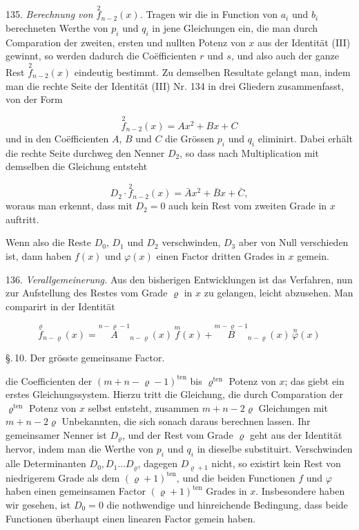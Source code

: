 135. \textit{Berechnung von $\overset{2}{f}_{n-2}(x)$.} Tragen wir die in Function von $a_i$ und $b_i$ berechneten Werthe von $p_i$ und $q_i$ in jene Gleichungen ein, die man durch Comparation der zweiten, ersten und nullten Potenz von $x$ aus der Identität (III) gewinnt, so werden dadurch die Co\"efficienten $r$ und $s$, und also auch der ganze Rest $\overset{2}{f}_{n-2}(x)$ eindeutig bestimmt. Zu demselben Resultate gelangt man, indem man die rechte Seite der Identität (III) Nr. 134 in drei Gliedern zusammenfasst, von der Form

\[
\overset{2}{f}_{n-2}(x) = Ax^2 + Bx + C
\]
und in den Co\"efficienten $A$, $B$ und $C$ die Grössen $p_i$ und $q_i$ eliminirt. Dabei erhält die rechte Seite durchweg den Nenner $D_2$, so dass nach Multiplication mit demselben die Gleichung entsteht

\[
D_2 \cdot \overset{2}{f}_{n-2}(x) = \bar A x^2 + \bar B x + \bar C,
\]
woraus man erkennt, dass mit $D_2 = 0$ auch kein Rest vom zweiten Grade in $x$ auftritt.

Wenn also die Reste $D_0$, $D_1$ und $D_2$ verschwinden, $D_3$ aber von Null verschieden ist, dann haben $f(x)$ und $\varphi(x)$ einen Factor dritten Grades in $x$ gemein.

136. \textit{Verallgemeinerung.} Aus den bisherigen Entwicklungen ist das Verfahren, nun zur Aufstellung des Restes vom Grade $\varrho$ in $x$ zu gelangen, leicht abzusehen. Man comparirt in der Identität

\[
\overset{\varrho}{f}_{n-\varrho}(x) = \overset{n-\varrho-1}{A}_{n-\varrho}(x)\,\overset{m}{f}(x) + \overset{m-\varrho-1}{B}_{n-\varrho}(x)\,\overset{n}{\varphi}(x)
\]



\begin{center}
\S.\,10. Der grösste gemeinsame Factor.
\end{center}

die Coefficienten der $(m+n-\varrho-1)^{\mathrm{ten}}$ bis $\varrho^{\mathrm{ten}}$ Potenz von $x$; das giebt ein erstes Gleichungssystem. Hierzu tritt die Gleichung, die durch Comparation der $\varrho^{\mathrm{ten}}$ Potenz von $x$ selbst entsteht, zusammen $m+n-2\varrho$ Gleichungen mit $m+n-2\varrho$ Unbekannten, die sich sonach daraus berechnen lassen. Ihr gemeinsamer Nenner ist $D_\varrho$, und der Rest vom Grade $\varrho$ geht aus der Identität hervor, indem man die Werthe von $p_i$ und $q_i$ in dieselbe substituirt. Verschwinden alle Determinanten $D_0, D_1 \ldots D_\varrho$, dagegen $D_{\varrho+1}$ nicht, so existirt kein Rest von niedrigerem Grade als dem $(\varrho+1)^{\mathrm{ten}}$, und die beiden Functionen $f$ und $\varphi$ haben einen gemeinsamen Factor $(\varrho+1)^{\mathrm{ten}}$ Grades in $x$. Insbesondere haben wir gesehen, ist $D_0 = 0$ die nothwendige und hinreichende Bedingung, dass beide Functionen überhaupt einen linearen Factor gemein haben.

